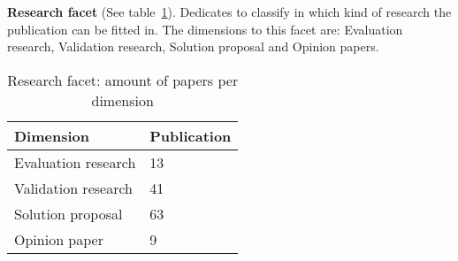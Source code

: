 \textbf{Research facet} (See table~\ref{table:research}).
Dedicates to classify in which kind of research the publication can be fitted in. 
The dimensions to this facet are: Evaluation research, Validation research, Solution proposal 
and Opinion papers.


\begin{table}[h]
\begin{center}
\begin{tabular}{p{4cm}p{4cm}}
\hline 
\textbf{Dimension} & \textbf{Publication} \\ 
\hline 
Evaluation research & 13 \\ 
\hline 
Validation research & 41 \\
\hline 
Solution proposal & 63\\
\hline 
Opinion paper & 9 \\ 
\hline  
\end{tabular}
\end{center}
\caption{Research facet: amount of papers per dimension}\label{table:research}
\end{table}


